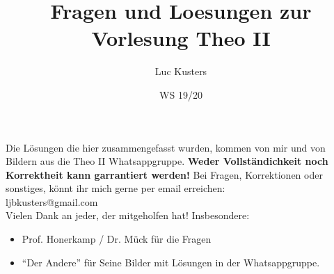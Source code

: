 \documentclass{scrartcl}
\title{Fragen und Loesungen zur Vorlesung Theo II}
\author{Luc Kusters}
\date{WS 19/20}
\begin{document}
\maketitle

\noindent
Die Lösungen die hier zusammengefasst wurden, kommen von mir und von Bildern
aus die Theo II Whatsappgruppe. 
\textbf{Weder Vollständichkeit noch Korrektheit kann garrantiert werden!}
Bei Fragen, Korrektionen oder sonstiges, könnt ihr mich gerne per 
email erreichen:\\ 
ljbkusters@gmail.com \\


\noindent
Vielen Dank an jeder, der mitgeholfen hat! Insbesondere:
\begin{itemize}
  \item Prof. Honerkamp / Dr. Mück für die Fragen
  \item ``Der Andere'' für Seine Bilder mit Lösungen in der Whatsappgruppe.
\end{itemize}

\clearpage
\newpage
\setcounter{page}{1}
\tableofcontents
\newpage
\end{document}
